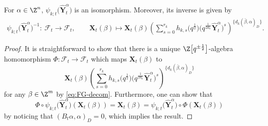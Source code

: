 \begin{Lemma}
 For $\alpha\in \Z^n$, $\psi_{k;t}\bigl(\mathbf{\hat{Y}}_{t}^{\alpha}\bigr)$ is an isomorphism. Moreover, its inverse is given by
 \begin{align*}
 \psi_{k;t}\bigl(\mathbf{\hat{Y}}_{t}^{\alpha}\bigr)^{-1}\colon\ \mathcal{F}_t\to \mathcal{F}_t,\qquad
 \mathbf{X}_{t}(\beta)\mapsto\mathbf{X}_{t}(\beta)\left(\sum\limits_{s=0}^{r_k} h_{k,s}\bigl(q^{\frac{1}{2}}\bigr)\bigl(q^{\frac{1}{2d_{k}}}\mathbf{\hat{Y}}_{t}^{\alpha}\bigr)^{s}\right)^{\{d_{k}(\bar{\beta},\alpha)_D\}}.
\end{align*}
\end{Lemma}
\begin{proof}
 It is straightforward to show that there is a unique $\Z\big[q^{\pm\frac{1}{2}}\big]$-algebra homomorphism $\Phi\colon \mathcal{F}_t\to \mathcal{F}_t$ which maps $\mathbf{X}_t(\beta)$ to
 \[
 \mathbf{X}_{t}(\beta)\left(\sum\limits_{s=0}^{r_k} h_{k,s}\bigl(q^{\frac{1}{2}}\bigr)\bigl(q^{\frac{1}{2d_{k}}}\mathbf{\hat{Y}}_{t}^{\alpha}\bigr)^{s}\right)^{\{d_{k}(\bar{\beta},\alpha)_D\}}
 \]
  for any $\beta\in \Z^m$ by \eqref{eq:FG-decom}.
 Furthermore, one can show that
 \[
 \Phi\circ \psi_{k;t}\bigl(\mathbf{\hat{Y}}_{t}^{\alpha}\bigr)(\mathbf{X}_t(\beta))=\mathbf{X}_t(\beta)=\psi_{k;t}\bigl(\mathbf{\hat{Y}}_{t}^{\alpha}\bigr)\circ \Phi(\mathbf{X}_t(\beta))
 \]
 by noticing that $(B_t\alpha, \alpha)_D=0$, which implies the result.
\end{proof}

